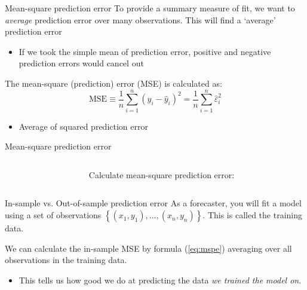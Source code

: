 \documentclass[aspectratio=169,t,11pt,table]{beamer}
\begin{document}
\begin{frame}{Mean-square prediction error}
  To provide a summary measure of fit, we want to \emph{average} prediction error over many observations. This will find a `average' prediction error
  \begin{itemize}
    \item If we took the simple mean of prediction error, positive and negative prediction errors would cancel out
  \end{itemize}

  \pause
  \bigskip
  The \alert{mean-square (prediction) error} (MSE) is calculated as:
  \begin{equation}\label{eq:mspe}
    \text{MSE} \equiv \frac{1}{n} \sum_{i=1}^n \left( y_i - \hat{y}_i \right)^2 = \frac{1}{n} \sum_{i=1}^n \hat{\varepsilon}_i^2
  \end{equation}
  \begin{itemize}
    \item Average of squared prediction error
  \end{itemize}
\end{frame}

\begin{frame}{Mean-square prediction error}
  \begin{columns}[T]
    \begin{column}{.3\textwidth}\vspace*{-\bigskipamount}
      
    \end{column}
    \hfill
    \begin{column}{.6\textwidth}
      Calculate mean-square prediction error:

    \end{column}
  \end{columns}
\end{frame}

\begin{frame}{In-sample vs. Out-of-sample prediction error}
  As a forecaster, you will \alert{fit} a model using a set of observations $\left\{ (x_1, y_1), \dots, (x_n, y_n) \right\}$. This is called the \alert{training data}.

  \bigskip
  We can calculate the \alert{in-sample MSE} by formula (\ref{eq:mspe}) averaging over all observations in the training data.
  \begin{itemize}
    \item This tells us how good we do at predicting the data \emph{we trained the model on}.
  \end{itemize} 
\end{frame}  
\end{document}
